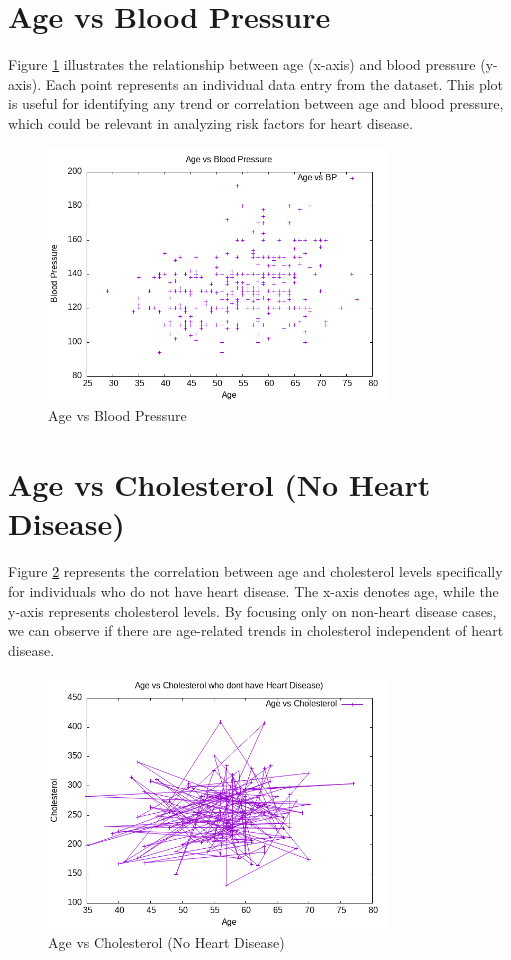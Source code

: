 \documentclass{article}
\begin{document}
	\section{Age vs Blood Pressure}
	Figure \ref{fig:fig2} illustrates the relationship between age (x-axis) and blood pressure (y-axis). Each point represents an individual data entry from the dataset. This plot is useful for identifying any trend or correlation between age and blood pressure, which could be relevant in analyzing risk factors for heart disease.
	\begin{figure}[h]
		\centering
		\includegraphics[width=0.8\textwidth]{../que4b/que4b.png}
		\caption{Age vs Blood Pressure}
		\label{fig:fig2}
	\end{figure}
	\section{Age vs Cholesterol (No Heart Disease)}
	Figure \ref{fig:fig3} represents the correlation between age and cholesterol levels specifically for individuals who do not have heart disease. The x-axis denotes age, while the y-axis represents cholesterol levels. By focusing only on non-heart disease cases, we can observe if there are age-related trends in cholesterol independent of heart disease.
	\begin{figure}[h]
		\centering
		\includegraphics[width=0.8\textwidth]{../que4c/que4c.png}
		\caption{Age vs Cholesterol (No Heart Disease)}
		\label{fig:fig3}
	\end{figure}
\end{document}
